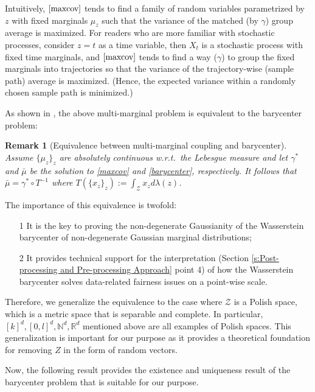 \documentclass[twoside,11pt]{article}
\newtheorem{rema}{Remark}[section]{\bfseries}{\itshape}
\begin{document}
Intuitively, $\eqref{maxcov}$ tends to find a family of random variables parametrized by $z$ with fixed marginals $\mu_z$ such that the variance of the matched (by $\gamma$) group average is maximized. For readers who are more familiar with stochastic processes, consider $z = t$ as a time variable, then $X_t$ is a stochastic process with fixed time marginals, and $\eqref{maxcov}$ tends to find a way ($\gamma$) to group the fixed marginals into trajectories so that the variance of the trajectory-wise (sample path) average is maximized. (Hence, the expected variance within a randomly chosen sample path is minimized.)

As shown in \cite{agueh2011barycenters, pass2013optimal}, the above multi-marginal problem is equivalent to the barycenter problem:

\begin{rema}[Equivalence between multi-marginal coupling and barycenter] \label{equivalence between couple and bary}
Assume $\{\mu_z\}_z$ are absolutely continuous w.r.t.\ the Lebesgue measure and let $\gamma^*$ and $\bar{\mu}$ be the solution to \eqref{maxcov} and \eqref{barycenter}, respectively. It follows that $\bar{\mu} = \gamma^* \circ T^{-1}$ where $T(\{x_z\}_z) := \int_{\mathcal{Z}} x_z d\lambda(z)$. 
\end{rema}

The importance of this equivalence is twofold:

\begin{itemize}
\item[1] It is the key to proving the non-degenerate Gaussianity of the Wasserstein barycenter of non-degenerate Gaussian marginal distributions;
\item[2] It provides technical support for the interpretation (Section \ref{s:Post-processing and Pre-processing Approach} point 4) of how the Wasserstein barycenter solves data-related fairness issues on a point-wise scale.
\end{itemize}
Therefore, we generalize the equivalence to the case where $\mathcal{Z}$ is a Polish space, which is a metric space that is separable and complete. In particular, $[k]^d, [0,l]^d, \mathbb{N}^d, \mathbb{R}^d$ mentioned above are all examples of Polish spaces. This generalization is important for our purpose as it provides a theoretical foundation for removing $Z$ in the form of random vectors.

Now, the following result provides the existence and uniqueness result of the barycenter problem that is suitable for our purpose.
\end{document}
